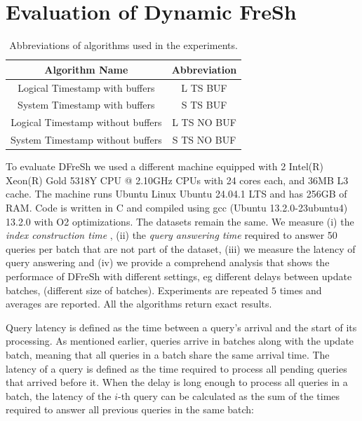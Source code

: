 \clearpage

\section{Evaluation of Dynamic FreSh}

\begin{table}[htbp]
    \centering
    \renewcommand{\arraystretch}{1.2} 
    \begin{tabular}{||c | c ||} 
        \hline
        \textbf{Algorithm Name} & \textbf{Abbreviation} \\ 
        \hline
        Logical Timestamp with buffers & L TS BUF \\ 
        \hline
    	System Timestamp with buffers & S TS BUF \\ 
        \hline
        Logical Timestamp without buffers & L TS NO BUF \\ 
        \hline
        System Timestamp without buffers & S TS NO BUF \\ 
        \hline
    \end{tabular}
    \caption{Abbreviations of algorithms used in the experiments.}
    \label{table:algorithms:abbreviation}
\end{table}



To evaluate DFreSh we used a different machine equipped with 
2 Intel(R) Xeon(R) Gold 5318Y CPU @ 2.10GHz
CPUs with 24 cores each, and 36MB L3 cache. The machine runs
Ubuntu Linux Ubuntu 24.04.1 LTS and has 256GB of RAM. Code is written in 
C and compiled using gcc (Ubuntu 13.2.0-23ubuntu4) 13.2.0 with O2 optimizations.
 The datasets remain the same.
We measure (i) the {\em index construction time} , 
(ii) the {\em query answering time} required to answer 50 queries per batch that are not
part of the dataset, 
(iii) we measure the latency of query answering and 
(iv) we provide a comprehend analysis that shows the performace of DFreSh with 
different settings, eg different delays between update batches, (different size of batches). 
Experiments are repeated $5$ times and averages are reported. All the algorithms
return exact results.

% 
Query latency is defined as the time between a query's arrival and the start of 
its processing.
% 
As mentioned earlier, queries arrive in batches along with the update batch, meaning 
that all queries in a batch share the same arrival time. The latency of a query is 
defined as the time required to process all pending queries that arrived before it.
%
When the delay is long enough to process all queries in a batch, the latency of the 
$i$-th query can be calculated as the sum of the times required to answer all previous 
queries in the same batch:

